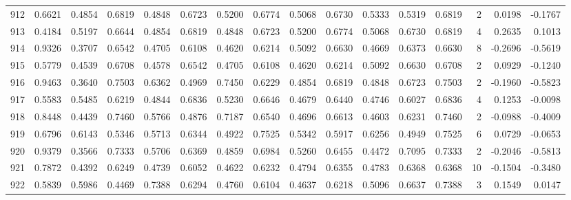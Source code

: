 \begin{tabular}{lrrrrrrrrrrrrrrr}
912 &      0.6621 &  0.4854 &  0.6819 &  0.4848 &  0.6723 &  0.5200 &  0.6774 &  0.5068 &  0.6730 &  0.5333 &   0.5319 &     0.6819 &      2 &                    0.0198 &                    -0.1767 \\
913 &      0.4184 &  0.5197 &  0.6644 &  0.4854 &  0.6819 &  0.4848 &  0.6723 &  0.5200 &  0.6774 &  0.5068 &   0.6730 &     0.6819 &      4 &                    0.2635 &                     0.1013 \\
914 &      0.9326 &  0.3707 &  0.6542 &  0.4705 &  0.6108 &  0.4620 &  0.6214 &  0.5092 &  0.6630 &  0.4669 &   0.6373 &     0.6630 &      8 &                   -0.2696 &                    -0.5619 \\
915 &      0.5779 &  0.4539 &  0.6708 &  0.4578 &  0.6542 &  0.4705 &  0.6108 &  0.4620 &  0.6214 &  0.5092 &   0.6630 &     0.6708 &      2 &                    0.0929 &                    -0.1240 \\
916 &      0.9463 &  0.3640 &  0.7503 &  0.6362 &  0.4969 &  0.7450 &  0.6229 &  0.4854 &  0.6819 &  0.4848 &   0.6723 &     0.7503 &      2 &                   -0.1960 &                    -0.5823 \\
917 &      0.5583 &  0.5485 &  0.6219 &  0.4844 &  0.6836 &  0.5230 &  0.6646 &  0.4679 &  0.6440 &  0.4746 &   0.6027 &     0.6836 &      4 &                    0.1253 &                    -0.0098 \\
918 &      0.8448 &  0.4439 &  0.7460 &  0.5766 &  0.4876 &  0.7187 &  0.6540 &  0.4696 &  0.6613 &  0.4603 &   0.6231 &     0.7460 &      2 &                   -0.0988 &                    -0.4009 \\
919 &      0.6796 &  0.6143 &  0.5346 &  0.5713 &  0.6344 &  0.4922 &  0.7525 &  0.5342 &  0.5917 &  0.6256 &   0.4949 &     0.7525 &      6 &                    0.0729 &                    -0.0653 \\
920 &      0.9379 &  0.3566 &  0.7333 &  0.5706 &  0.6369 &  0.4859 &  0.6984 &  0.5260 &  0.6455 &  0.4472 &   0.7095 &     0.7333 &      2 &                   -0.2046 &                    -0.5813 \\
921 &      0.7872 &  0.4392 &  0.6249 &  0.4739 &  0.6052 &  0.4622 &  0.6232 &  0.4794 &  0.6355 &  0.4783 &   0.6368 &     0.6368 &     10 &                   -0.1504 &                    -0.3480 \\
922 &      0.5839 &  0.5986 &  0.4469 &  0.7388 &  0.6294 &  0.4760 &  0.6104 &  0.4637 &  0.6218 &  0.5096 &   0.6637 &     0.7388 &      3 &                    0.1549 &                     0.0147 \\

\end{tabular}
